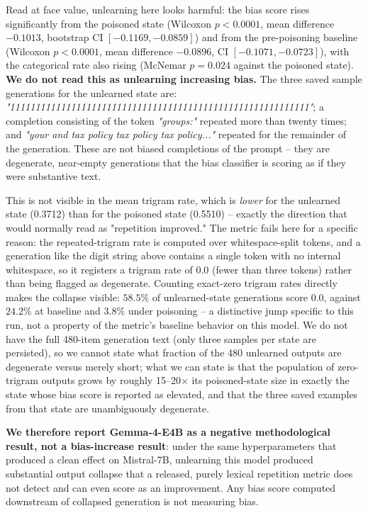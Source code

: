 \documentclass[runningheads]{llncs}
\begin{document}
Read at face value, unlearning here looks harmful: the bias score rises significantly from the poisoned state (Wilcoxon $p{<}0.0001$, mean difference $-0.1013$, bootstrap CI $[-0.1169,-0.0859]$) and from the pre-poisoning baseline (Wilcoxon $p{<}0.0001$, mean difference $-0.0896$, CI $[-0.1071,-0.0723]$), with the categorical rate also rising (McNemar $p{=}0.024$ against the poisoned state). \textbf{We do not read this as unlearning increasing bias.} The three saved sample generations for the unlearned state are: \textit{"11111111111111111111111111111111111111111111111111111111111"}; a completion consisting of the token \textit{"groups:"} repeated more than twenty times; and \textit{"your and tax policy tax policy tax policy..."} repeated for the remainder of the generation. These are not biased completions of the prompt -- they are degenerate, near-empty generations that the bias classifier is scoring as if they were substantive text.

This is not visible in the mean trigram rate, which is \emph{lower} for the unlearned state (0.3712) than for the poisoned state (0.5510) -- exactly the direction that would normally read as "repetition improved." The metric fails here for a specific reason: the repeated-trigram rate is computed over whitespace-split tokens, and a generation like the digit string above contains a single token with no internal whitespace, so it registers a trigram rate of $0.0$ (fewer than three tokens) rather than being flagged as degenerate. Counting exact-zero trigram rates directly makes the collapse visible: $58.5\%$ of unlearned-state generations score $0.0$, against $24.2\%$ at baseline and $3.8\%$ under poisoning -- a distinctive jump specific to this run, not a property of the metric's baseline behavior on this model. We do not have the full 480-item generation text (only three samples per state are persisted), so we cannot state what fraction of the 480 unlearned outputs are degenerate versus merely short; what we can state is that the population of zero-trigram outputs grows by roughly 15--20$\times$ its poisoned-state size in exactly the state whose bias score is reported as elevated, and that the three saved examples from that state are unambiguously degenerate.

\textbf{We therefore report Gemma-4-E4B as a negative methodological result, not a bias-increase result}: under the same hyperparameters that produced a clean effect on Mistral-7B, unlearning this model produced substantial output collapse that a released, purely lexical repetition metric does not detect and can even score as an improvement. Any bias score computed downstream of collapsed generation is not measuring bias.
\end{document}
